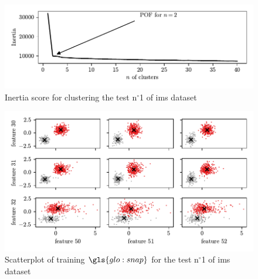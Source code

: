 \begin{figure}
    \centering
    \includegraphics{images/IMS/InertiaScore_01.pdf}
    \caption{Inertia score for clustering the test $\text{n}^\circ$1 of \gls{ims} dataset}
    \label{fig:InertiaScore_01}
\end{figure}

\begin{figure}
    \centering
    \includegraphics{images/IMS/Clusters.pdf}
    \caption{Scatterplot of training $\gls{glo:snap}$ for the test $\text{n}^\circ$1 of \gls{ims} dataset}
    \label{fig:Clusters}
\end{figure}